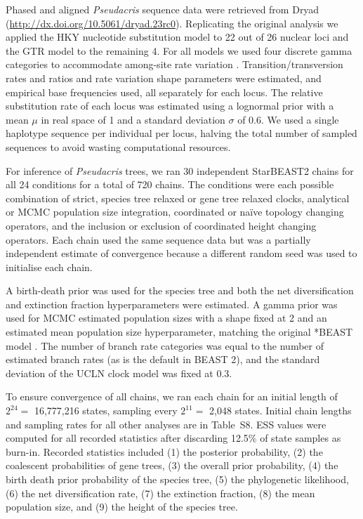 \documentclass[nogrid]{MBE}%
\begin{document}
Phased and aligned \textit{Pseudacris} sequence data were retrieved from Dryad
(\url{http://dx.doi.org/10.5061/dryad.23rc0}). Replicating the original
analysis we applied the HKY nucleotide substitution model \citep{Hasegawa1985}
to 22 out of 26 nuclear loci and the GTR model \citep{Tavare1986} to the
remaining 4. For all models we used four discrete gamma categories to
accommodate among-site rate variation \citep{Yang1994}. Transition/transversion
rates and ratios and rate variation shape parameters were estimated, and
empirical base frequencies used, all separately for each locus. The relative
substitution rate of each locus was estimated using a lognormal prior with a
mean $\mu$ in real space of 1 and a standard deviation $\sigma$ of 0.6. We
used a single haplotype sequence per individual per locus, halving the total
number of sampled sequences to avoid wasting computational resources.

For inference of \textit{Pseudacris} trees, we ran 30 independent StarBEAST2
chains for all 24 conditions for a total of 720 chains. The conditions were
each possible combination of strict, species tree relaxed or gene tree relaxed
clocks, analytical or MCMC population size integration, coordinated or na\"ive
topology changing operators, and the inclusion or exclusion of coordinated
height changing operators. Each chain used the same sequence data but was a
partially independent estimate of convergence because a different random seed
was used to initialise each chain.

A birth-death prior was used for the species tree and both the net
diversification and extinction fraction hyperparameters were estimated. A
gamma prior was used for MCMC estimated population sizes with a shape fixed at
2 and an estimated mean population size hyperparameter, matching the original
*BEAST model \citep{Heled01032010}. The number of branch rate categories was
equal to the number of estimated branch rates (as is the default in BEAST 2),
and the standard deviation of the UCLN clock model was fixed at 0.3.

To ensure convergence of all chains, we ran each chain for an initial length
of $2^{24} =$ 16,777,216 states, sampling every $2^{11} =$ 2,048 states. Initial
chain lengths and sampling rates for all other analyses are in Table~S8. ESS
values were computed for all recorded statistics after discarding 12.5\% of
state samples as burn-in. Recorded statistics included (1) the posterior
probability, (2) the coalescent probabilities of gene trees, (3) the overall
prior probability, (4) the birth death prior probability of the species tree,
(5) the phylogenetic likelihood, (6) the net diversification rate, (7) the
extinction fraction, (8) the mean population size, and (9) the height of the
species tree.
\end{document}
